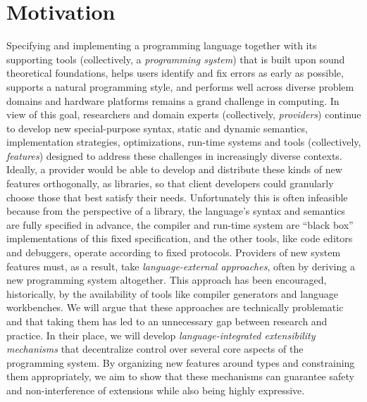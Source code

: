 \vspace{-25pt}
\section{Motivation}\label{motivation}
Specifying and implementing a programming language together with its supporting tools (collectively, a \emph{programming system}) that is built upon sound theoretical foundations, helps users identify and fix errors as early as possible, supports a natural programming style, and performs well across diverse problem domains and hardware platforms remains a grand challenge in computing. In view of this goal, researchers and domain experts (collectively, \emph{providers}) continue to develop new special-purpose syntax, static and dynamic semantics, implementation strategies, optimizations, run-time systems and tools (collectively, \emph{features})  designed to address these challenges in increasingly diverse contexts. Ideally, a provider would be able to develop and distribute these kinds of new features orthogonally, as libraries, so that client developers could granularly choose those that best satisfy their needs. Unfortunately this is often infeasible because from the perspective of a library, the language's syntax and semantics are fully specified in advance, the compiler and run-time system are ``black box'' implementations of this fixed specification, and the other tools, like code editors and debuggers, operate according to fixed protocols. Providers of new system features must, as a result, take \emph{language-external approaches}, often by deriving a new programming system altogether. This approach has been encouraged, historically, by the availability of tools like compiler generators and language workbenches. We will argue that these approaches are technically problematic and that taking them has led to an unnecessary gap between research and practice. In their place, we will develop \emph{language-integrated extensibility mechanisms} that decentralize control over several core aspects of the programming system. By organizing new features around {types} and constraining them appropriately, we aim to show that these mechanisms can guarantee safety and non-interference of extensions while also being highly expressive.


